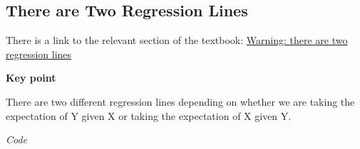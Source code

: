 \documentclass[
]{article}
\newenvironment{Shaded}{\begin{snugshade}}{\end{snugshade}}
\newcommand{\CommentTok}[1]{\textcolor[rgb]{0.56,0.35,0.01}{\textit{#1}}}
\newcommand{\DecValTok}[1]{\textcolor[rgb]{0.00,0.00,0.81}{#1}}
\newcommand{\KeywordTok}[1]{\textcolor[rgb]{0.13,0.29,0.53}{\textbf{#1}}}
\newcommand{\NormalTok}[1]{#1}
\newcommand{\OperatorTok}[1]{\textcolor[rgb]{0.81,0.36,0.00}{\textbf{#1}}}
\newcommand{\StringTok}[1]{\textcolor[rgb]{0.31,0.60,0.02}{#1}}
\begin{document}
\hypertarget{there-are-two-regression-lines}{%
\subsection{There are Two Regression
Lines}\label{there-are-two-regression-lines}}

There is a link to the relevant section of the textbook:
\href{https://rafalab.github.io/dsbook/regression.html\#warning-there-are-two-regression-lines}{Warning:
there are two regression lines}

\textbf{Key point}

There are two different regression lines depending on whether we are
taking the expectation of Y given X or taking the expectation of X given
Y.

\emph{Code}

\begin{Shaded}
\end{Shaded}
\end{document}
